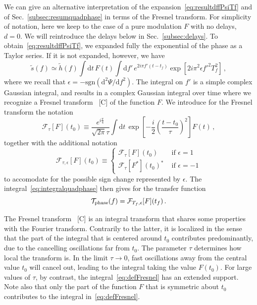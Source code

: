 \documentclass[aps,showpacs,twocolumn,
prd,superscriptaddress,nofootinbib]{revtex4-1}
\newcommand{\be}{\begin{equation}}
\newcommand{\ee}{\end{equation}}
\newcommand\ud{{\mathrm{d}}}
\newcommand\calF{{\mathcal{F}}}
\newcommand\calT{{\mathcal{T}}}
\newcommand{\tf}{t_{f}}
\newcommand{\Tf}{T_{f}}
\newcommand{\SM}[1]{{\color{Red} #1}}
\begin{document}
We can give an alternative interpretation of the expansion~\eqref{eq:resultdffPsiTf} and of Sec.~\ref{subsec:resumquadphase} in terms of the Fresnel transform. For simplicity of notation, here we keep to the case of a pure modulation $F$ with no delays, $d=0$. We will reintroduce the delays below in Sec.~\ref{subsec:delays}. To obtain~\eqref{eq:resultdffPsiTf}, we expanded fully the exponential of the phase as a Taylor series. If it is not expanded, however, we have
\be\label{eq:integralquadphase}
	\tilde{s}(f)	\simeq \tilde{h}(f) \int \ud t\, F(t) \int\ud f'\, e^{2i\pi f' (t-\tf)} \exp\left[ 2i\pi^{2} \epsilon{f'}^{2} \Tf^{2} \right] \,,
\ee
where we recall that $\epsilon = -\mathrm{sgn}(\ud ^{2} \Psi/\ud f^{2})$. The integral on $f'$ is a simple complex Gaussian integral, and results in a complex Gaussian integral over time where we recognize a Fresnel transform~\cite{} \SM{[C]} of the function $F$. We introduce for the Fresnel transform the notation
\be\label{eq:defFresnel}
	\calF_{\tau}[F](t_{0}) \equiv \frac{e^{i\frac{\pi}{4}}}{\sqrt{2\pi} \tau} \int \ud t \, \exp\left[ - \frac{i}{2} \left( \frac{t-t_{0}}{\tau} \right)^{2}\right] F(t) \,,
\ee
together with the additional notation
\be\label{eq:Fresnelsign}
	\calF_{\tau, \epsilon}[F](t_{0}) \equiv
\begin{cases}
	 \calF_{\tau}[F](t_{0}) &\text{ if } \epsilon=1 \\
	 \calF_{\tau}[F^{*}](t_{0})^{*} &\text{ if } \epsilon=-1
\end{cases}
\ee
to accomodate for the possible sign change represented by $\epsilon$. The integral~\eqref{eq:integralquadphase} then gives for the transfer function
\be\label{eq:resultFresnel}
	\calT_{\rm phase}(f) = \calF_{\Tf, \epsilon}[F](\tf) \,.
\ee

The Fresnel transform~\cite{} \SM{[C]} is an integral transform that shares some properties with the Fourier transform. Contrarily to the latter, it is localized in the sense that the part of the integral that is centered around $t_{0}$ contributes predominantly, due to the cancelling oscillations far from $t_{0}$.  The parameter $\tau$ determines how local the transform is. In the limit $\tau\rightarrow 0$, fast oscillations away from the central value $t_{0}$ will cancel out, leading to the integral taking the value $F(t_{0})$. For large values of $\tau$, by contrast, the integral~\eqref{eq:defFresnel} has an extended support. Note also that only the part of the function $F$ that is symmetric about $t_{0}$ contributes to the integral in~\eqref{eq:defFresnel}.
\end{document}
